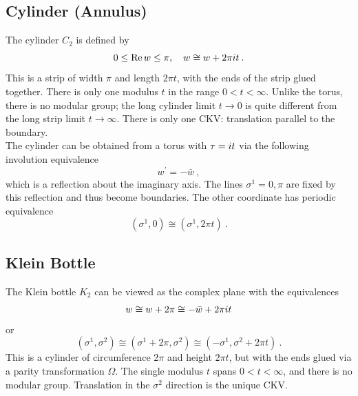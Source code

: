 \subsection*{Cylinder (Annulus)} 

The cylinder $C_{2}$ is defined by 
\begin{equation}
	0 \leq \operatorname{Re} w \leq \pi, \quad w \cong w+2 \pi i t \:. \label{7.1.5} 
\end{equation}
This is a strip of width $\pi$ and length $2 \pi t$, with the ends of the strip glued together. 
There is only one modulus $t$ in the range $0 < t < \infty$. 
Unlike the torus, there is no modular group; the long cylinder limit $t \rightarrow 0$ is quite different from the long strip limit $t \rightarrow \infty$. 
There is only one CKV: translation parallel to the boundary. \\ 

The cylinder can be obtained from a torus with $\tau=i t$ via the following involution equivalence 
\begin{equation}
	w^{\prime}=-\bar{w} \:, \label{7.1.6} 
\end{equation}
which is a reflection about the imaginary axis. 
The lines $\sigma^{1}=0, \pi$ are fixed by this reflection and thus become boundaries. 
The other coordinate has periodic equivalence 
\begin{equation}
	(\sigma^{1}, 0) \cong(\sigma^{1}, 2 \pi t) \:. \label{7.1.7} 
\end{equation}

\subsection*{Klein Bottle} 

The Klein bottle $K_{2}$ can be viewed as the complex plane with the equivalences 
\begin{equation}
	w \cong w+2 \pi \cong-\bar{w}+2 \pi i t \label{7.1.8} 
\end{equation}
or 
\begin{equation}
	(\sigma^{1}, \sigma^{2}) \cong (\sigma^{1}+2 \pi, \sigma^{2}) \cong (-\sigma^{1}, \sigma^{2}+2 \pi t) \:. \label{7.1.9} 
\end{equation}
This is a cylinder of circumference $2 \pi$ and height $2 \pi t$, but with the ends glued via a parity transformation $\Omega$. 
The single modulus $t$ spans $0 < t < \infty$, and there is no modular group. 
Translation in the $\sigma^{2}$ direction is the unique CKV. 

